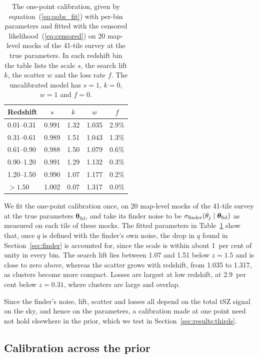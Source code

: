 \begin{table}
\centering
\caption{The one-point calibration, given by equation~(\ref{eq:qobs_fit}) with per-bin parameters and fitted
with the censored likelihood~(\ref{eq:censored}) on 20 map-level mocks of the 41-tile survey at the true
parameters. In each redshift bin the table lists the scale $s$, the search lift $k$, the scatter $w$ and the
loss rate $f$. The uncalibrated model has $s=1$, $k=0$, $w=1$ and $f=0$.}
\label{tab:calib}
\begin{tabular}{lcccc}
\toprule
Redshift & $s$ & $k$ & $w$ & $f$ \\
\midrule
0.01--0.31 & 0.991 & 1.32 & 1.035 & 2.9\% \\
0.31--0.61 & 0.989 & 1.51 & 1.043 & 1.3\% \\
0.61--0.90 & 0.988 & 1.50 & 1.079 & 0.6\% \\
0.90--1.20 & 0.991 & 1.29 & 1.132 & 0.3\% \\
1.20--1.50 & 0.990 & 1.07 & 1.177 & 0.2\% \\
$>1.50$    & 1.002 & 0.07 & 1.317 & 0.0\% \\
\bottomrule
\end{tabular}
\end{table}

We fit the one-point calibration once, on 20 map-level mocks of the 41-tile survey at the true parameters
$\bm\theta_\mathrm{fid}$, and take its finder noise to be $\sigma_\mathrm{finder}(\theta_j\mid\bm\theta_\mathrm{fid})$ as
measured on each tile of these mocks. The fitted parameters in Table~\ref{tab:calib} show that, once $q$ is
defined with the finder's own noise, the drop in $q$ found in Section~\ref{sec:finder} is accounted for, since
the scale is within about 1~per cent of unity in every bin. The search lift lies between 1.07 and 1.51 below
$z = 1.5$ and is close to zero above, whereas the scatter grows with redshift, from 1.035 to 1.317, as
clusters become more compact. Losses are largest at low redshift, at 2.9~per cent below $z = 0.31$, where
clusters are large and overlap.

Since the finder's noise, lift, scatter and losses all depend on the total tSZ signal on the sky, and hence
on the parameters, a calibration made at one point need not hold elsewhere in the prior, which we test in
Section~\ref{sec:results:thirds}.

\subsection{Calibration across the prior}\label{sec:calib-grid}

